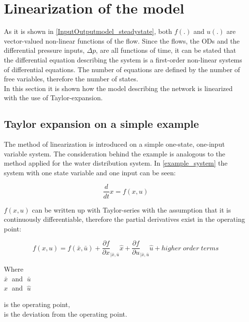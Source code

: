 \section{Linearization of the model} 
\label{Linearization}

As it is shown in \eqref{InputOutputmodel_steadystate}, both $f(.)$ and $u(.)$ are vector-valued non-linear functions of the flow. Since the flows, the ODs and the differential pressure inputs, $\Delta p$, are all functions of time, it can be stated that the differential equation describing the system is a first-order non-linear systems of differential equations. The number of equations are defined by the number of free variables, therefore the number of states.
\\
In this section it is shown how the model describing the network is linearized with the use of Taylor-expansion.

\subsection{Taylor expansion on a simple example}
 \label{Taylorexamplesection}

The method of linearization is introduced on a simple one-state, one-input variable system. The consideration behind the example is analogous to the method applied for the water distribution system. In \eqref{example_system} the system with one state variable and one input can be seen: 

\begin{equation}
\frac{d}{dt} x = f(x,u)
 \label{example_system}
\end{equation}

$f(x,u)$ can be written up with Taylor-series with the assumption that it is continuously differentiable, therefore the partial derivatives exist in the operating point: 

\begin{equation}
f(x,u) = f(\bar{x},\bar{u}) + \frac{\partial f}{\partial x}_{|\bar{x}, \bar{u}} \hat{x} + \frac{\partial f}{\partial u}_{|\bar{x}, \bar{u}} \hat{u} + higher \; order \; terms  
 \label{TaylorExpansion}
\end{equation}

\begin{minipage}[t]{0.20\textwidth}
Where\\
\hspace*{8mm} $\bar{x} \;$ and $\; \bar{u}$ \\
\hspace*{8mm} $\hat{x} \;$ and $\; \hat{u}$ 
\end{minipage}
\begin{minipage}[t]{0.68\textwidth}
\vspace*{2mm}
is the operating point,\\
is the deviation from the operating point.
\end{minipage}

